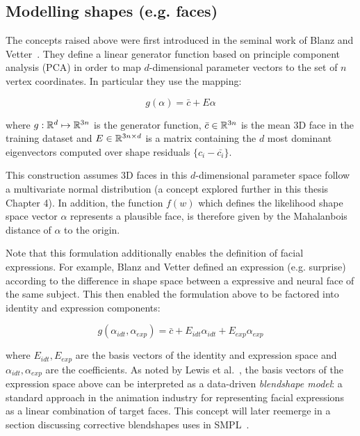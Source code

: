\subsection{Modelling shapes (e.g. faces)}

The concepts raised above were first introduced in the seminal work of Blanz and Vetter~\cite{blanz-vetter}. They define a linear generator function based on principle component analysis (PCA) in order to map $d$-dimensional parameter vectors to the set of $n$ vertex coordinates. In particular they use the mapping:

\begin{equation}
    g(\alpha) = \bar{c} + E\alpha
\end{equation}

where $g: {\mathbb{R}^{d}} \mapsto {\mathbb{R}^{3n}}$ is the generator function, $\bar{c} \in {\mathbb{R}^{3n}}$ is the mean 3D face in the training dataset and $E \in {\mathbb{R}^{3n \times d}}$ is a matrix containing the $d$ most dominant eigenvectors computed over shape residuals $\{c_i - \bar{c_i}\}$. 

This construction assumes 3D faces in this $d$-dimensional parameter space follow a multivariate normal distribution (a concept explored further in this thesis Chapter 4). In addition, the function $f(w)$ which defines the likelihood shape space vector $\alpha$ represents a plausible face, is therefore given by the Mahalanbois distance of $\alpha$ to the origin. 

Note that this formulation additionally enables the definition of facial expressions. For example, Blanz and Vetter defined an expression (e.g. surprise) according to the difference in shape space between a expressive and neural face of the same subject. This then enabled the formulation above to be factored into identity and expression components:

\begin{equation}
    g(\alpha_{idt}, \alpha_{exp}) = \bar{c} + E_{idt}\alpha_{idt} + E_{exp}\alpha_{exp}
\end{equation}

where $E_{idt}, E_{exp}$ are the basis vectors of the identity and expression space and $\alpha_{idt}, \alpha_{exp}$ are the coefficients. As noted by Lewis et al.~\cite{xxx}, the basis vectors of the expression space above can be interpreted as a data-driven \emph{blendshape model}: a standard approach in the animation industry for representing facial expressions as a linear combination of target faces. This concept will later reemerge in a section discussing corrective blendshapes uses in SMPL~\cite{loper15smpl}.

